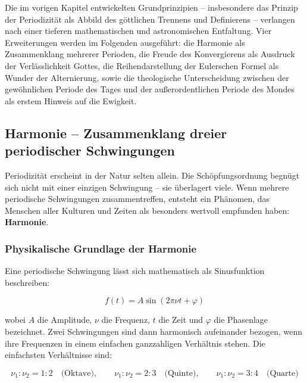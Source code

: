 ﻿\documentclass[a4paper,12pt]{article}
\theoremstyle{definition}
\begin{document}
Die im vorigen Kapitel entwickelten Grundprinzipien -- insbesondere das Prinzip
der Periodizität als Abbild des göttlichen Trennens und Definierens -- verlangen
nach einer tieferen mathematischen und astronomischen Entfaltung. Vier Erweiterungen
werden im Folgenden ausgeführt: die Harmonie als Zusammenklang mehrerer Perioden,
die Freude des Konvergierens als Ausdruck der Verlässlichkeit Gottes, die
Reihendarstellung der Eulerschen Formel als Wunder der Alternierung, sowie die
theologische Unterscheidung zwischen der gewöhnlichen Periode des Tages und der
außerordentlichen Periode des Mondes als erstem Hinweis auf die Ewigkeit.

\subsection{Harmonie -- Zusammenklang dreier periodischer Schwingungen}

Periodizität erscheint in der Natur selten allein. Die Schöpfungsordnung begnügt
sich nicht mit einer einzigen Schwingung -- sie überlagert viele. Wenn mehrere
periodische Schwingungen zusammentreffen, entsteht ein Phänomen, das Menschen
aller Kulturen und Zeiten als besonders wertvoll empfunden haben: \textbf{Harmonie}.

\subsubsection{Physikalische Grundlage der Harmonie}

Eine periodische Schwingung lässt sich mathematisch als Sinusfunktion beschreiben:

\begin{equation}
	f(t) = A \sin(2\pi \nu t + \varphi)
\end{equation}

wobei $A$ die Amplitude, $\nu$ die Frequenz, $t$ die Zeit und $\varphi$ die
Phasenlage bezeichnet. Zwei Schwingungen sind dann harmonisch aufeinander bezogen,
wenn ihre Frequenzen in einem einfachen ganzzahligen Verhältnis stehen. Die
einfachsten Verhältnisse sind:

\begin{equation}
	\nu_1 : \nu_2 = 1 : 2 \quad \text{(Oktave)}, \qquad
	\nu_1 : \nu_2 = 2 : 3 \quad \text{(Quinte)}, \qquad
	\nu_1 : \nu_2 = 3 : 4 \quad \text{(Quarte)}
\end{equation}
\end{document}
